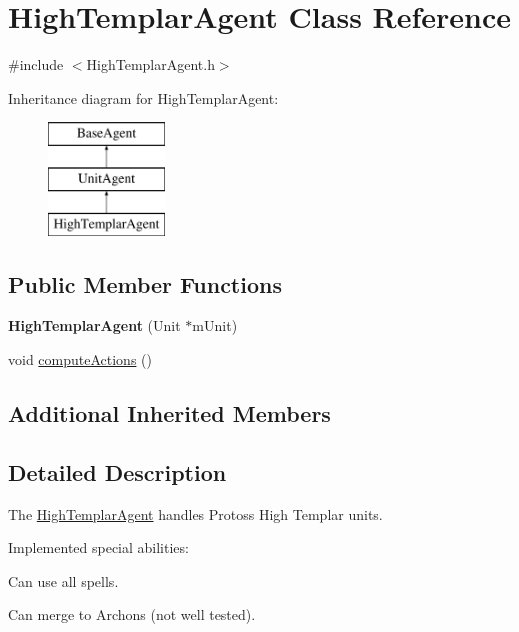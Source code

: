 \hypertarget{class_high_templar_agent}{\section{High\-Templar\-Agent Class Reference}
\label{class_high_templar_agent}
}


{\ttfamily \#include $<$High\-Templar\-Agent.\-h$>$}

Inheritance diagram for High\-Templar\-Agent\-:\begin{figure}[H]
\begin{center}
\leavevmode
\includegraphics[height=3.000000cm]{class_high_templar_agent}
\end{center}
\end{figure}
\subsection*{Public Member Functions}
\begin{DoxyCompactItemize}
\item 
\hypertarget{class_high_templar_agent_a8829a6eb5cfd8d24323cd7a556b64af8}{{\bfseries High\-Templar\-Agent} (Unit $\ast$m\-Unit)}\label{class_high_templar_agent_a8829a6eb5cfd8d24323cd7a556b64af8}

\item 
void \hyperlink{class_high_templar_agent_adc387e330e1d8f5b1603c301c233896b}{compute\-Actions} ()
\end{DoxyCompactItemize}
\subsection*{Additional Inherited Members}


\subsection{Detailed Description}
The \hyperlink{class_high_templar_agent}{High\-Templar\-Agent} handles Protoss High Templar units.

Implemented special abilities\-:
\begin{DoxyItemize}
\item Can use all spells.
\item Can merge to Archons (not well tested).
\end{DoxyItemize}

